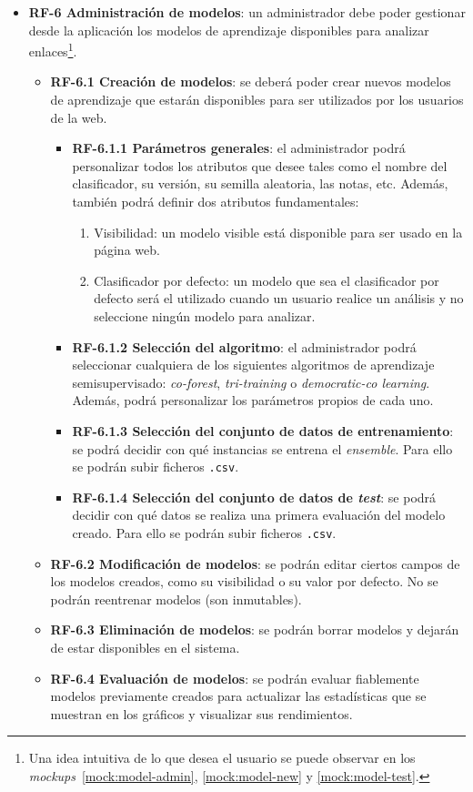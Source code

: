 \begin{itemize}
	\item \textbf{RF-6 Administración de modelos}: un administrador debe poder gestionar desde la aplicación los modelos de aprendizaje disponibles para analizar enlaces\footnote{Una idea intuitiva de lo que desea el usuario se puede observar en los \textit{mockups}~\ref{mock:model-admin}, \ref{mock:model-new} y \ref{mock:model-test}.}.
	\begin{itemize}
	\item \textbf{RF-6.1 Creación de modelos}: se deberá poder crear nuevos modelos de aprendizaje que estarán disponibles para ser utilizados por los usuarios de la web.
	\begin{itemize}
		\item \textbf{RF-6.1.1 Parámetros generales}: el administrador podrá personalizar todos los atributos que desee tales como el nombre del clasificador, su versión, su semilla aleatoria, las notas, etc. Además, también podrá definir dos atributos fundamentales:
		\begin{enumerate}
			\item Visibilidad: un modelo visible está disponible para ser usado en la página web.
			\item Clasificador por defecto: un modelo que sea el clasificador por defecto será el utilizado cuando un usuario realice un análisis y no seleccione ningún modelo para analizar.
		\end{enumerate}
		\item \textbf{RF-6.1.2 Selección del algoritmo}: el administrador podrá seleccionar cualquiera de los siguientes algoritmos de aprendizaje semisupervisado: \textit{co-forest}, \textit{tri-training} o \textit{democratic-co learning}. Además, podrá personalizar los parámetros propios de cada uno.
		\item \textbf{RF-6.1.3 Selección del conjunto de datos de entrenamiento}: se podrá decidir con qué instancias se entrena el \textit{ensemble}. Para ello se podrán subir ficheros \texttt{.csv}.
		\item \textbf{RF-6.1.4 Selección del conjunto de datos de \textit{test}}: se podrá decidir con qué datos se realiza una primera evaluación del modelo creado. Para ello se podrán subir ficheros \texttt{.csv}.
	\end{itemize}
	
	\item \textbf{RF-6.2 Modificación de modelos}: se podrán editar ciertos campos de los modelos creados, como su visibilidad o su valor por defecto. No se podrán reentrenar modelos (son inmutables).
	\item \textbf{RF-6.3 Eliminación de modelos}: se podrán borrar modelos y dejarán de estar disponibles en el sistema.
	\item \textbf{RF-6.4 Evaluación de modelos}: se podrán evaluar fiablemente modelos previamente creados para actualizar las estadísticas que se muestran en los gráficos y visualizar sus rendimientos.
	\end{itemize}



\end{itemize}
